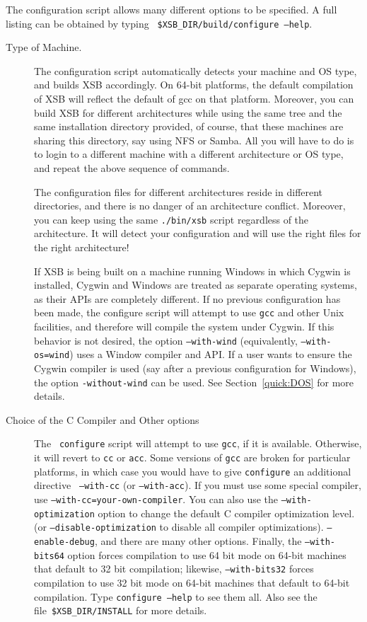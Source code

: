 The configuration script allows many different options to be
specified.  A full listing can be obtained by typing {\tt
\$XSB\_DIR/build/configure --help}.
\begin{description}
\item[Type of Machine.]  The configuration script automatically
  detects your machine and OS type, and builds XSB accordingly. On
  64-bit platforms, the default compilation of XSB will reflect the
  default of gcc on that platform.  Moreover, you can build XSB for
  different architectures while using the same tree and the same
  installation directory provided, of course, that these machines are
  sharing this directory, say using NFS or Samba. All you will have to
  do is to login to a different machine with a different architecture
  or OS type, and repeat the above sequence of commands.
  
  The configuration files for different architectures reside in different
  directories, and there is no danger of an architecture conflict.
  Moreover, you can keep using the same {\tt ./bin/xsb} script regardless
  of the architecture. It will detect your configuration and will use the
  right files for the right architecture! 

  If XSB is being built on a machine running Windows in which Cygwin
  is installed, Cygwin and Windows are treated as separate operating
  systems, as their APIs are completely different.  If no previous
  configuration has been made, the configure script will attempt to
  use {\tt gcc} and other Unix facilities, and therefore will compile
  the system under Cygwin.  If this behavior is not desired, the
  option {\tt --with-wind} (equivalently, {\tt --with-os=wind}) uses a
  Window compiler and API.  If a user wants to ensure the Cygwin
  compiler is used (say after a previous configuration for Windows),
  the option {\tt -without-wind} can be used.  See
  Section~\ref{quick:DOS} for more details.

    
\item[Choice of the C Compiler and Other options] \label{cc} The {\tt
  configure} script will attempt to use {\tt gcc}, if it is available.
  Otherwise, it will revert to {\tt cc} or {\tt acc}.  Some versions
  of {\tt gcc} are broken for particular platforms, in which case you
  would have to give {\tt configure} an additional directive {\tt
    --with-cc} (or {\tt --with-acc}).  If you must use some special
  compiler, use {\tt --with-cc=your-own-compiler}.  You can also use
  the {\tt --with-optimization} option to change the default C
  compiler optimization level.  (or {\tt --disable-optimization} to
  disable all compiler optimizations).  {\tt --enable-debug}, and
  there are many other options.  Finally, the {\tt --with-bits64}
  option forces compilation to use 64 bit mode on 64-bit machines that
  default to 32 bit compilation; likewise, {\tt --with-bits32} forces
  compilation to use 32 bit mode on 64-bit machines that default to
  64-bit compilation.  Type {\tt configure --help} to see them
  all. Also see the file~\verb'$XSB_DIR/INSTALL' for more details.


\end{description}
